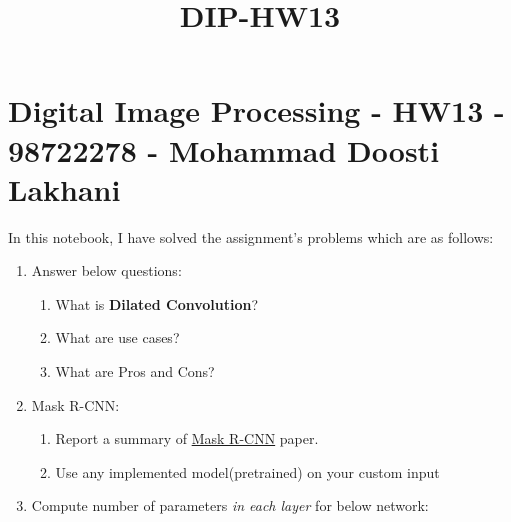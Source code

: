 \documentclass[11pt]{article}
\title{DIP-HW13}
\providecommand{\tightlist}{%
      \setlength{\itemsep}{0pt}\setlength{\parskip}{0pt}}
\begin{document}
    
    
    \maketitle
    
    

    
    \hypertarget{digital-image-processing---hw13---98722278---mohammad-doosti-lakhani}{%
\section{Digital Image Processing - HW13 - 98722278 - Mohammad Doosti
Lakhani}\label{digital-image-processing---hw13---98722278---mohammad-doosti-lakhani}}

In this notebook, I have solved the assignment's problems which are as
follows:

\begin{enumerate}
\def\labelenumi{\arabic{enumi}.}
\tightlist
\item
  Answer below questions:

  \begin{enumerate}
  \def\labelenumii{\arabic{enumii}.}
  \tightlist
  \item
    What is \textbf{Dilated Convolution}?
  \item
    What are use cases?
  \item
    What are Pros and Cons?
  \end{enumerate}
\item
  Mask R-CNN:

  \begin{enumerate}
  \def\labelenumii{\arabic{enumii}.}
  \tightlist
  \item
    Report a summary of
    \href{http://openaccess.thecvf.com/content_ICCV_2017/papers/He_Mask_R-CNN_ICCV_2017_paper.pdf}{Mask
    R-CNN} paper.
  \item
    Use any implemented model(pretrained) on your custom input
  \end{enumerate}
\item
  Compute number of parameters \emph{in each layer} for below network:
\end{enumerate}
\end{document}
